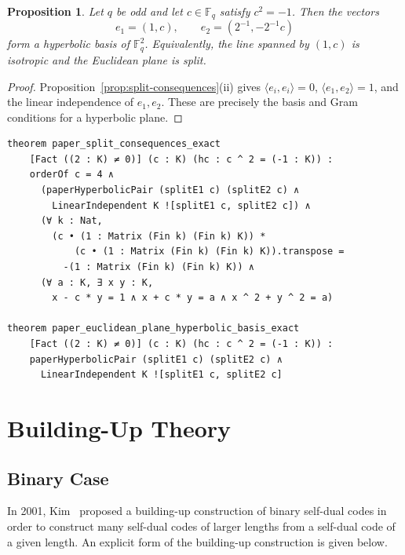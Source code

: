 \documentclass[12pt]{article}
\newtheorem{prop}[theorem]{Proposition}
\newcommand{\F}{\mathbb{F}}
\begin{document}

\begin{prop}\label{prop:eucl-hyp}
Let \(q\) be odd and let \(c\in\F_q\) satisfy \(c^2=-1\). Then the vectors
\[
e_1=(1,c), \qquad e_2=(2^{-1},-2^{-1}c)
\]
form a hyperbolic basis of\/ $\F_q^2$. Equivalently, the line spanned by $(1,c)$ is isotropic and the Euclidean plane is split.
\end{prop}

\begin{proof}
Proposition~\ref{prop:split-consequences}(ii) gives
\(\langle e_i,e_i\rangle=0\), \(\langle e_1,e_2\rangle=1\), and the
linear independence of \(e_1,e_2\). These are precisely the basis and Gram
conditions for a hyperbolic plane.
\end{proof}

\begin{lstlisting}[caption={Lean for Proposition~\ref{prop:split-consequences} and Proposition~\ref{prop:eucl-hyp}.}]
theorem paper_split_consequences_exact
    [Fact ((2 : K) ≠ 0)] (c : K) (hc : c ^ 2 = (-1 : K)) :
    orderOf c = 4 ∧
      (paperHyperbolicPair (splitE1 c) (splitE2 c) ∧
        LinearIndependent K ![splitE1 c, splitE2 c]) ∧
      (∀ k : Nat,
        (c • (1 : Matrix (Fin k) (Fin k) K)) *
            (c • (1 : Matrix (Fin k) (Fin k) K)).transpose =
          -(1 : Matrix (Fin k) (Fin k) K)) ∧
      (∀ a : K, ∃ x y : K,
        x - c * y = 1 ∧ x + c * y = a ∧ x ^ 2 + y ^ 2 = a)

theorem paper_euclidean_plane_hyperbolic_basis_exact
    [Fact ((2 : K) ≠ 0)] (c : K) (hc : c ^ 2 = (-1 : K)) :
    paperHyperbolicPair (splitE1 c) (splitE2 c) ∧
      LinearIndependent K ![splitE1 c, splitE2 c]
\end{lstlisting}

\section{Building-Up Theory}
\label{sec:building-up}

\subsection{Binary Case}

In 2001, Kim~\cite{Kim2001} proposed a building-up construction of binary self-dual codes in order to construct many self-dual codes of larger lengths from a self-dual code of a given length. An explicit form of the building-up construction is given below.
\end{document}
